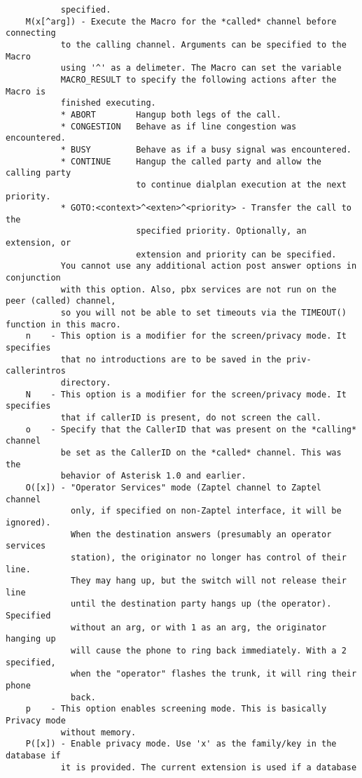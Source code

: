 \begin{verbatim}
           specified.
    M(x[^arg]) - Execute the Macro for the *called* channel before connecting
           to the calling channel. Arguments can be specified to the Macro
           using '^' as a delimeter. The Macro can set the variable
           MACRO_RESULT to specify the following actions after the Macro is
           finished executing.
           * ABORT        Hangup both legs of the call.
           * CONGESTION   Behave as if line congestion was encountered.
           * BUSY         Behave as if a busy signal was encountered.
           * CONTINUE     Hangup the called party and allow the calling party
                          to continue dialplan execution at the next priority.
           * GOTO:<context>^<exten>^<priority> - Transfer the call to the
                          specified priority. Optionally, an extension, or
                          extension and priority can be specified.
           You cannot use any additional action post answer options in conjunction
           with this option. Also, pbx services are not run on the peer (called) channel,
           so you will not be able to set timeouts via the TIMEOUT() function in this macro.
    n    - This option is a modifier for the screen/privacy mode. It specifies
           that no introductions are to be saved in the priv-callerintros
           directory.
    N    - This option is a modifier for the screen/privacy mode. It specifies
           that if callerID is present, do not screen the call.
    o    - Specify that the CallerID that was present on the *calling* channel
           be set as the CallerID on the *called* channel. This was the
           behavior of Asterisk 1.0 and earlier.
    O([x]) - "Operator Services" mode (Zaptel channel to Zaptel channel
             only, if specified on non-Zaptel interface, it will be ignored).
             When the destination answers (presumably an operator services
             station), the originator no longer has control of their line.
             They may hang up, but the switch will not release their line
             until the destination party hangs up (the operator). Specified
             without an arg, or with 1 as an arg, the originator hanging up
             will cause the phone to ring back immediately. With a 2 specified,
             when the "operator" flashes the trunk, it will ring their phone
             back.
    p    - This option enables screening mode. This is basically Privacy mode
           without memory.
    P([x]) - Enable privacy mode. Use 'x' as the family/key in the database if
           it is provided. The current extension is used if a database

\end{verbatim}
